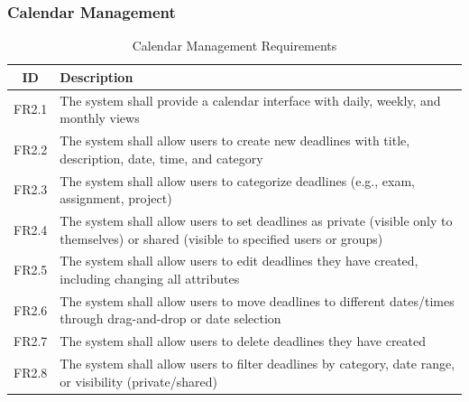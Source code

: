 \documentclass{article}
\begin{document}
\subsubsection{Calendar Management}
\begin{table}[h!]
\centering
\begin{tabular}{|c|p{10cm}|}
\hline
\textbf{ID} & \textbf{Description} \\
\hline
FR2.1 & The system shall provide a calendar interface with daily, weekly, and monthly views \\
FR2.2 & The system shall allow users to create new deadlines with title, description, date, time, and category \\
FR2.3 & The system shall allow users to categorize deadlines (e.g., exam, assignment, project) \\
FR2.4 & The system shall allow users to set deadlines as private (visible only to themselves) or shared (visible to specified users or groups) \\
FR2.5 & The system shall allow users to edit deadlines they have created, including changing all attributes \\
FR2.6 & The system shall allow users to move deadlines to different dates/times through drag-and-drop or date selection \\
FR2.7 & The system shall allow users to delete deadlines they have created \\
FR2.8 & The system shall allow users to filter deadlines by category, date range, or visibility (private/shared) \\
\hline
\end{tabular}
\caption{Calendar Management Requirements}
\label{tab :calendar_management}
\end{table}

\clearpage
\end{document}

